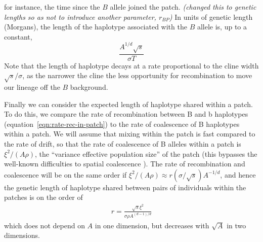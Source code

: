 \documentclass{article}
\newcommand{\plr}[1]{{\it\color{blue}(#1)}}
\begin{document}
for instance, the time since the $B$ allele joined the patch.
\plr{changed this to genetic lengths so as not to introduce another parameter, $r_{BP}$}
In units of genetic length (Morgans),
the length of the haplotype associated with the $B$ allele is, up to a constant,
\begin{equation}
  \frac{A^{1/d}\sqrt{s}}{\sigma T}
\end{equation} 
Note that the length of haplotype decays at a rate proportional to the
cline width $\sqrt{s} / \sigma$, as the narrower the cline the less
opportunity for recombination to move our lineage off the $B$ background. 
 
Finally we can consider the expected length of haplotype shared within a patch. 
To do this, we compare the rate of recombination between B and b haplotypes (equation~\ref{eqn:rate-rec-in-patch})
to the rate of coalescence of B haplotypes within a patch. 
We will assume that mixing within the patch is fast compared to the rate of drift, 
so that the rate of coalescence of B alleles within a patch is 
$\xi^2/(A\rho)$,
the ``variance effective population size'' of the patch
(this bypasses the well-known difficulties to spatial coalescence \citep{felsenstein1978pain,bartonetheridgedepaulis}).
The rate of recombination and coalescence will be on the same order if
$\xi^2 /(A\rho) \approx r (\sigma/\sqrt{s}) A^{-1/d}$, 
and hence the genetic length of haplotype shared between pairs of
individuals within the patches is on the order of
\begin{align}
  r = \frac{\sqrt{s} \xi^2}{\sigma \rho A^{(d-1)/d}} 
\end{align}
which does not depend on $A$ in one dimension,
but decreases with $\sqrt{A}$ in two dimensions.

\end{document}
